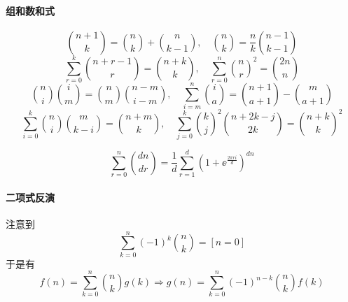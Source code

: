 \documentclass{proart}
\begin{document}
\paragraph{组和数和式}
\[ \binom{n+1}{k} = \binom{n}{k} + \binom{n}{k-1}, \quad \binom{n}{k} = \frac{n}{k} \binom{n-1}{k-1} \]
\[ \sum\limits_{r=0}^k \binom{n+r-1}{r} = \binom{n+k}{k}, \quad \sum\limits_{r=0}^n \binom{n}{r}^2 = \binom{2n}{n} \]
\[ \binom{n}{i}\binom{i}{m} = \binom{n}{m}\binom{n-m}{i-m}, \quad \sum\limits_{i=m}^n \binom{i}{a} = \binom{n+1}{a+1} - \binom{m}{a+1} \]
\[ \sum\limits_{i=0}^k \binom{n}{i}\binom{m}{k-i} = \binom{n+m}{k}, \quad \sum\limits_{j=0}^k \binom{k}{j}^2 \binom{n+2k-j}{2k} = \binom{n+k}{k}^2 \]

\[ \sum\limits_{r=0}^n \binom{dn}{dr} = \frac{1}{d} \sum_{r=1}^d  \left( 1+\ee^{\tfrac{2\pi r i}{d}} \right)^{dn} \]

\paragraph{二项式反演}

注意到
\[ \sum_{k=0}^n (-1)^k \binom{n}{k} = [n=0] \]
于是有
\[ f(n) = \sum_{k=0}^n \binom{n}{k} g(k) \Rightarrow g(n) = \sum_{k=0}^n (-1)^{n-k}\binom{n}{k} f(k) \]
\end{document}
